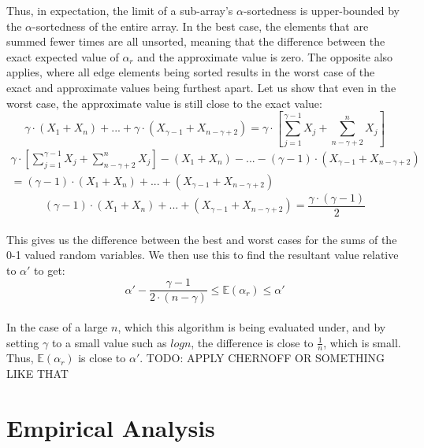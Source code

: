\documentclass{article}
\begin{document}
Thus, in expectation, the limit of a sub-array's $\alpha$-sortedness is upper-bounded by the $\alpha$-sortedness of the entire array.
 In the best case, the elements that are summed fewer times are all unsorted, meaning that the difference between the exact expected value of $\alpha_{r}$ and the approximate value is zero.
The opposite also applies, where all edge elements being sorted results in the worst case of the exact and approximate values being furthest apart.
 Let us show that even in the worst case, the approximate value is still close to the exact value:
\begin{equation*}
\gamma \cdot (X_{1} + X_{n}) + ... + \gamma \cdot (X_{\gamma - 1} + X_{n - \gamma + 2}) = \gamma \cdot \left[ \sum_{j = 1}^{\gamma - 1} X_{j} + \sum_{n - \gamma + 2}^{n} X_{j}  \right]
\end{equation*}
\begin{multline*}
\gamma \cdot \left[ \sum_{j = 1}^{\gamma - 1} X_{j} + \sum_{n - \gamma + 2}^{n} X_{j}  \right] - (X_{1} + X_{n}) - ... - (\gamma - 1) \cdot (X_{\gamma - 1} + X_{n - \gamma + 2}) \\
= (\gamma - 1) \cdot (X_{1} + X_{n}) + ... + (X_{\gamma - 1} + X_{n - \gamma + 2})
\end{multline*}
\begin{equation*}
(\gamma - 1) \cdot (X_{1} + X_{n}) + ... + (X_{\gamma - 1} + X_{n - \gamma + 2}) = \frac{\gamma \cdot (\gamma - 1)}{2}
\end{equation*}
\paragraph{}This gives us the difference between the best and worst cases for the sums of the 0-1 valued random variables.
 We then use this to find the resultant value relative to $\alpha'$ to get:
\begin{equation*}
\alpha' - \frac{\gamma - 1}{2 \cdot (n - \gamma)} \leq \mathbb E(\alpha_{r}) \leq \alpha'
\end{equation*}
\paragraph{}In the case of a large $n$, which this algorithm is being evaluated under, and by setting $\gamma$ to a small value such as $logn$, the difference is close to $\frac{1}{n}$, which is small.
 Thus, $\mathbb E(\alpha_{r})$ is close to $\alpha'$.
 TODO: APPLY CHERNOFF OR SOMETHING LIKE THAT
\section{Empirical Analysis}
\end{document}
